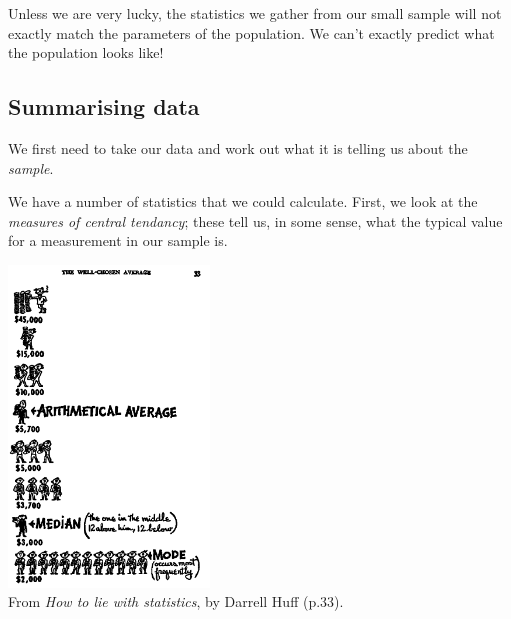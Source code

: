 




Unless we are very lucky, the statistics we gather from our small sample will not
exactly match the parameters of the population. We can't exactly predict what the
population looks like!

\subsection*{Summarising data}
We first need to take our data and work out what it is telling us about the \emph{sample}.

We have a number of statistics that we could calculate. First, we look at the \emph{measures
of central tendancy}; these tell us, in some sense, what the typical value for a measurement
in our sample is.

\begin{center}
  \includegraphics[width=0.4\textwidth]{wellchosenaverage}\\
  \vspace{5px}
  \small{From \emph{How to lie with statistics}, by Darrell Huff (p.33).}
\end{center}

